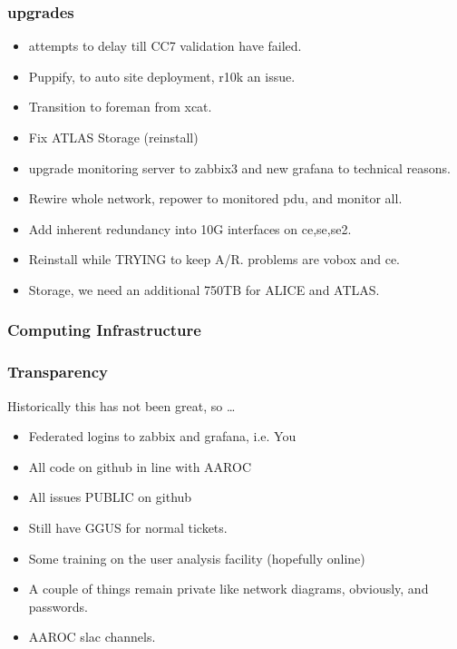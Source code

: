 \documentclass{beamer}
\begin{document}
\begin{frame}
  \frametitle{upgrades}
  \begin{itemize}
    \item attempts to delay till CC7 validation have failed.
    \item Puppify, to auto site deployment, r10k an issue.
    \item Transition to foreman from xcat.
    \item Fix ATLAS Storage (reinstall)
    \item upgrade monitoring server to zabbix3 and new grafana to technical reasons.
    \item Rewire whole network, repower to monitored pdu, and monitor all.
    \item Add inherent redundancy into 10G interfaces on ce,se,se2.
    \item Reinstall while TRYING to keep A/R. problems are vobox and ce. 
    \item Storage, we need an additional 750TB for ALICE and ATLAS.
  \end{itemize}
\end{frame}
\begin{frame}
  \frametitle{Computing Infrastructure}
\end{frame}
\begin{frame}
  \frametitle{Transparency}
  Historically this has not been great, so \ldots
  \begin{itemize}
    \item Federated logins to zabbix and grafana, i.e. You
    \item All code on github in line with AAROC
    \item All issues PUBLIC on github
    \item Still have GGUS for normal tickets.
    \item Some training on the user analysis facility (hopefully online)
    \item A couple of things remain private like network diagrams, obviously, and passwords.
    \item AAROC slac channels.
  \end{itemize}
\end{frame}
\end{document}
